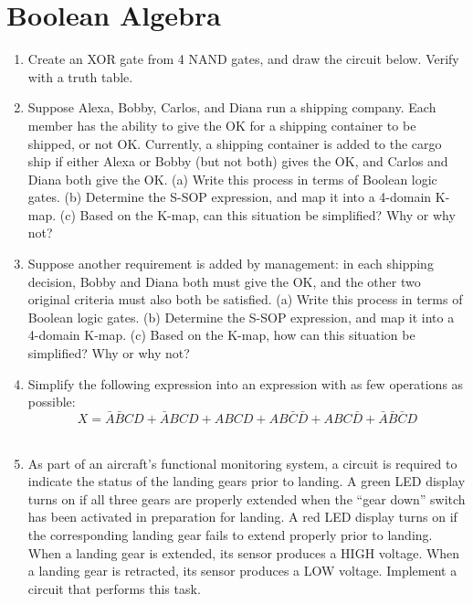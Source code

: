 \documentclass[10pt]{article}
\begin{document}
\section{Boolean Algebra}
\begin{enumerate}
\item Create an XOR gate from 4 NAND gates, and draw the circuit below.  Verify with a truth table. \\ \vspace{5cm}
\item Suppose Alexa, Bobby, Carlos, and Diana run a shipping company.  Each member has the ability to give the OK for a shipping container to be shipped, or not OK.  Currently, a shipping container is added to the cargo ship if either Alexa or Bobby (but not both) gives the OK, and Carlos and Diana both give the OK.  (a) Write this process in terms of Boolean logic gates.  (b) Determine the S-SOP expression, and map it into a 4-domain K-map.  (c) Based on the K-map, can this situation be simplified?  Why or why not?  \\ \vspace{4cm}
\item Suppose another requirement is added by management: in each shipping decision, Bobby and Diana both must give the OK, and the other two original criteria must also both be satisfied.  (a) Write this process in terms of Boolean logic gates.  (b) Determine the S-SOP expression, and map it into a 4-domain K-map.  (c) Based on the K-map, how can this situation be simplified?  Why or why not?  \\ \vspace{4cm}
\item Simplify the following expression into an expression with as few operations as possible:
\begin{equation}
X = \bar{A}\bar{B}CD+\bar{A}BCD+ABCD+AB\bar{C}\bar{D}+ABC\bar{D}+\bar{A}\bar{B}\bar{C}D
\end{equation} \\ \vspace{3cm}
\item As part of an aircraft's functional monitoring system, a circuit is required to indicate the status of the landing gears prior to landing.  A green LED display turns on if all three gears are properly extended when the ``gear down'' switch has been activated in preparation for landing.  A red LED display turns on if the corresponding landing gear fails to extend properly prior to landing.  When a landing gear is extended, its sensor produces a HIGH voltage.  When a landing gear is retracted, its sensor produces a LOW voltage.  Implement a circuit that performs this task.
\end{enumerate}
\end{document}

